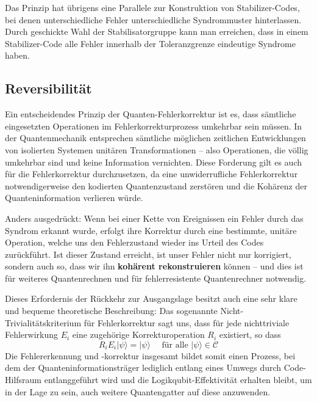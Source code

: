 Das Prinzip hat übrigens eine Parallele zur Konstruktion von Stabilizer-Codes, bei denen unterschiedliche Fehler unterschiedliche Syndrommuster hinterlassen. Durch geschickte Wahl der Stabilisatorgruppe kann man erreichen, dass in einem Stabilizer-Code alle Fehler innerhalb der Toleranzgrenze eindeutige Syndrome haben. \cite{gottesmann Stabilizer Codes}

\subsection{Reversibilität}
Ein entscheidendes Prinzip der Quanten-Fehlerkorrektur ist es, dass sämtliche eingesetzten Operationen im Fehlerkorrekturprozess umkehrbar sein müssen. In der Quantenmechanik entsprechen sämtliche möglichen zeitlichen Entwicklungen von isolierten Systemen unitären Transformationen – also Operationen, die völlig umkehrbar sind und keine Information vernichten. Diese Forderung gilt es auch für die Fehlerkorrektur durchzusetzen, da eine unwiderrufliche Fehlerkorrektur notwendigerweise den kodierten Quantenzustand zerstören und die Kohärenz der Quanteninformation verlieren würde. \cite[Seite 450-451]{nielsen_michael_a_and_isaac_l_chuang_quantum_2010}

Anders ausgedrückt: Wenn bei einer Kette von Ereignissen ein Fehler durch das Syndrom erkannt wurde, erfolgt ihre Korrektur durch eine bestimmte, unitäre Operation, welche uns den Fehlerzustand wieder ins Urteil des Codes zurückführt. Ist dieser Zustand erreicht, ist unser Fehler nicht nur korrigiert, sondern auch so, dass wir ihn\textbf{ kohärent rekonstruieren} können – und dies ist für weiteres Quantenrechnen und für fehlerresistente Quantenrechner notwendig.

Dieses Erfordernis der Rückkehr zur Ausgangslage besitzt auch eine sehr klare und bequeme theoretische Beschreibung: Das sogenannte Nicht-Trivialitätskriterium für Fehlerkorrektur sagt uns, dass für jede nichttriviale Fehlerwirkung \(E_i\) eine zugehörige Korrekturoperation \(R_i\) existiert, so dass 
\begin{equation}
    R_{i} E_{i}|\psi\rangle=|\psi\rangle \quad \text { für alle }|\psi\rangle \in \mathcal{C}
\end{equation}
Die Fehlererkennung und -korrektur insgesamt bildet somit einen Prozess, bei dem der Quanteninformationsträger lediglich entlang eines Umwegs durch Code-Hilfsraum entlanggeführt wird und die Logikqubit-Effektivität erhalten bleibt, um in der Lage zu sein, auch weitere Quantengatter auf diese anzuwenden.

